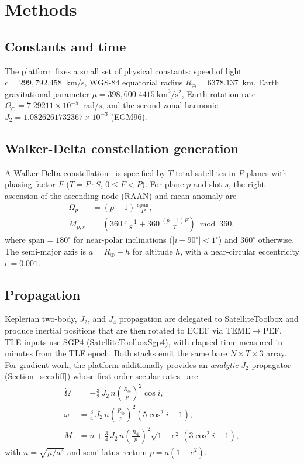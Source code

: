 \documentclass[10pt,twocolumn]{article}
\begin{document}
\section{Methods}\label{sec:methods}

\subsection{Constants and time}
The platform fixes a small set of physical constants: speed of light
$c=299{,}792.458$~km/s, WGS-84 equatorial radius $R_\oplus=6378.137$~km, Earth
gravitational parameter $\mu=398{,}600.4415~\text{km}^3/\text{s}^2$, Earth
rotation rate $\Omega_\oplus=7.29211{\times}10^{-5}$~rad/s, and the second zonal
harmonic $J_2=1.0826261732367{\times}10^{-3}$ (EGM96).

\subsection{Walker-Delta constellation generation}
A Walker-Delta constellation~\cite{walker} is specified by $T$ total satellites in $P$ planes
with phasing factor $F$ ($T=P\cdot S$, $0\le F<P$). For plane $p$ and slot $s$,
the right ascension of the ascending node (RAAN) and mean anomaly are
\begin{align}
\Omega_p &= (p-1)\,\frac{\text{span}}{P}, \\
M_{p,s}  &= \left(360\,\frac{s-1}{S} + 360\,\frac{(p-1)F}{T}\right) \bmod 360,
\end{align}
where $\text{span}=180^\circ$ for near-polar inclinations ($|i-90^\circ|<1^\circ$)
and $360^\circ$ otherwise. The semi-major axis is $a=R_\oplus+h$ for altitude
$h$, with a near-circular eccentricity $e=0.001$.

\subsection{Propagation}
Keplerian two-body, $J_2$, and $J_4$ propagation are delegated to
SatelliteToolbox and produce inertial positions that are then rotated to ECEF via
TEME$\rightarrow$PEF. TLE inputs use SGP4 (SatelliteToolboxSgp4), with elapsed
time measured in minutes from the TLE epoch. Both stacks emit the same bare
$N{\times}T{\times}3$ array. For gradient work, the platform additionally provides
an \emph{analytic} $J_2$ propagator (Section~\ref{sec:diff}) whose first-order
secular rates~\cite{vallado} are
\begin{align}
\dot\Omega &= -\tfrac{3}{2}\,J_2\, n \left(\tfrac{R_\oplus}{p}\right)^2 \cos i,\\
\dot\omega &= \tfrac{3}{4}\,J_2\, n \left(\tfrac{R_\oplus}{p}\right)^2 (5\cos^2 i-1),\\
\dot M     &= n + \tfrac{3}{4}\,J_2\, n \left(\tfrac{R_\oplus}{p}\right)^2 \sqrt{1-e^2}\,(3\cos^2 i-1),
\end{align}
with $n=\sqrt{\mu/a^3}$ and semi-latus rectum $p=a(1-e^2)$.
\end{document}
